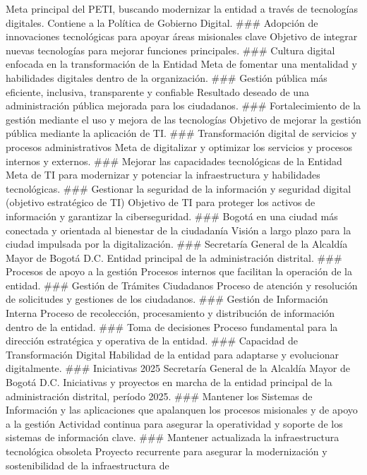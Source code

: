 \documentclass[
	a4paper, %
	12pt, %
]{include/CSSullivanBusinessReport}
\begin{document}
Meta principal del PETI, buscando modernizar la entidad a través de
tecnologías digitales. Contiene a la Política de Gobierno Digital.
\#\#\# Adopción de innovaciones tecnológicas para apoyar áreas
misionales clave Objetivo de integrar nuevas tecnologías para mejorar
funciones principales. \#\#\# Cultura digital enfocada en la
transformación de la Entidad Meta de fomentar una mentalidad y
habilidades digitales dentro de la organización. \#\#\# Gestión pública
más eficiente, inclusiva, transparente y confiable Resultado deseado de
una administración pública mejorada para los ciudadanos. \#\#\#
Fortalecimiento de la gestión mediante el uso y mejora de las
tecnologías Objetivo de mejorar la gestión pública mediante la
aplicación de TI. \#\#\# Transformación digital de servicios y procesos
administrativos Meta de digitalizar y optimizar los servicios y procesos
internos y externos. \#\#\# Mejorar las capacidades tecnológicas de la
Entidad Meta de TI para modernizar y potenciar la infraestructura y
habilidades tecnológicas. \#\#\# Gestionar la seguridad de la
información y seguridad digital (objetivo estratégico de TI) Objetivo de
TI para proteger los activos de información y garantizar la
ciberseguridad. \#\#\# Bogotá en una ciudad más conectada y orientada al
bienestar de la ciudadanía Visión a largo plazo para la ciudad impulsada
por la digitalización. \#\#\# Secretaría General de la Alcaldía Mayor de
Bogotá D.C. Entidad principal de la administración distrital. \#\#\#
Procesos de apoyo a la gestión Procesos internos que facilitan la
operación de la entidad. \#\#\# Gestión de Trámites Ciudadanos Proceso
de atención y resolución de solicitudes y gestiones de los ciudadanos.
\#\#\# Gestión de Información Interna Proceso de recolección,
procesamiento y distribución de información dentro de la entidad. \#\#\#
Toma de decisiones Proceso fundamental para la dirección estratégica y
operativa de la entidad. \#\#\# Capacidad de Transformación Digital
Habilidad de la entidad para adaptarse y evolucionar digitalmente.
\#\#\# Iniciativas 2025 Secretaría General de la Alcaldía Mayor de
Bogotá D.C. Iniciativas y proyectos en marcha de la entidad principal de
la administración distrital, período 2025. \#\#\# Mantener los Sistemas
de Información y las aplicaciones que apalanquen los procesos misionales
y de apoyo a la gestión Actividad continua para asegurar la operatividad
y soporte de los sistemas de información clave. \#\#\# Mantener
actualizada la infraestructura tecnológica obsoleta Proyecto recurrente
para asegurar la modernización y sostenibilidad de la infraestructura de
\end{document}
